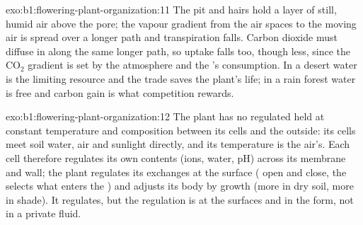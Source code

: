 \begin{solution}{exo:b1:flowering-plant-organization:11}
The pit and hairs hold a layer of still, humid air above the pore; the
vapour gradient from the air spaces to the moving air is spread over a
longer path and transpiration falls. Carbon dioxide must diffuse in
along the same longer path, so uptake falls too, though less, since the
$\mathrm{CO_2}$ gradient is set by the atmosphere and the 's
consumption. In a desert water is the limiting resource and the trade
saves the plant's life; in a rain forest water is free and carbon gain
is what competition rewards.
\end{solution}

\begin{solution}{exo:b1:flowering-plant-organization:12}
The plant has no regulated  held at constant
temperature and composition between its cells and the outside: its
cells meet soil water, air and sunlight directly, and its temperature
is the air's. Each cell therefore regulates its own contents (ions,
water, pH) across its membrane and wall; the plant regulates its
exchanges at the surface ( open and close, the 
selects what enters the ) and adjusts its body by growth (more
 in dry soil, more  in shade). It regulates, but the
regulation is at the surfaces and in the form, not in a private fluid.
\end{solution}

